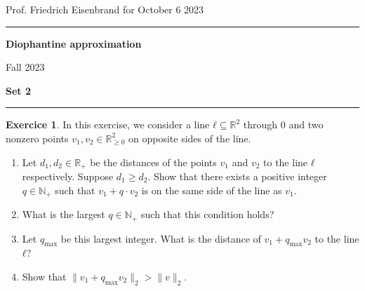 \documentclass[12pt,a4paper]{article}
\date{}
\theoremstyle{plain}
\newtheorem*{Sol*}{Solution}
\theoremstyle{definition}
\newtheorem{Ex}{Exercice}
\newif\ifsolutions
\newcommand{\exercise}[2]{
			\begin{Ex} #1 \end{Ex}
			\ifsolutions  \begin{Sol*} #2 \end{Sol*} \bigskip \else \bigskip  \fi
		}
\begin{document}
\begin{center}
{Prof. Friedrich Eisenbrand \hfill for October 6 2023}
\end{center}
	
\hrule\vspace{\baselineskip}

\begin{center}
\textbf{ Diophantine approximation}

Fall 2023

\bigskip

\textbf{Set 2}
\ifsolutions{\textbf{- Corrig\'e}} \else{} \fi
\end{center}

\hrule\vspace{\baselineskip}



\exercise{
  In this exercise, we consider a line $ℓ ⊆ ℝ^2$ through $0$ and two nonzero points $v_1, v_2 ∈ ℝ_{≥0}^2$ on opposite sides of the line. 
  \begin{enumerate}
  \item Let $d_1,d_2 ∈ ℝ_+$ be the distances of the points $v_1$ and $v_2$ to the line $ℓ$ respectively. Suppose $d_1 ≥ d_2$. Show that there exists a positive integer $q ∈ℕ_+$ such that $v_1 + q ⋅v_2$ is on the same side of the line as $v_1$.
  \item What is the largest $q ∈ ℕ_+$ such that this condition holds?
  \item Let $q_{\max}$ be this largest integer. What is the distance of $v_1 + q_{\max}v_2$ to the line $ℓ$?
    \item Show that $\| v_1 + q_{\max}v_2\|_2 > \|v\|_2$. 
  \end{enumerate}
  
}{}
\end{document}
